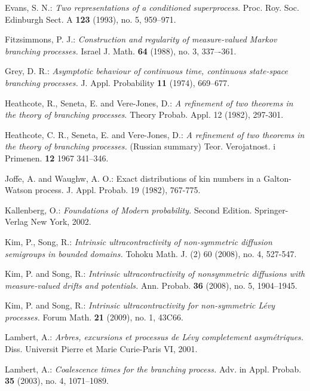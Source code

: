 \documentclass[12pt,a4paper]{amsart}
\numberwithin{equation}{section}
\theoremstyle{plain}
\theoremstyle{definition}
\theoremstyle{remark}
\begin{document}
\begin{thebibliography}{99}
Evans, S. N.:
\emph{Two representations of a conditioned superprocess.}
Proc. Roy. Soc. Edinburgh Sect. A \textbf{123} (1993), no. 5, 959--971.

Fitzsimmons, P. J.: 
\emph{Construction and regularity of measure-valued Markov branching processes.} 
Israel J. Math. \textbf{64} (1988), no. 3, 337–-361.

Grey, D. R.:
\emph{Asymptotic behaviour of continuous time, continuous state-space branching processes.}
J. Appl. Probability \textbf{11} (1974), 669--677.

Heathcote, R.,  Seneta, E.  and Vere-Jones, D.:
\emph{ A refinement of two theorems in the theory of branching processes}.
Theory Probab. Appl. 12 (1982), 297-301.

Heathcote, C. R., Seneta, E. and Vere-Jones, D.:
\emph{A refinement of two theorems in the theory of branching processes.} (Russian summary)
Teor. Verojatnost. i Primenen. \textbf{12} 1967 341--346.

Joffe, A. and Waughw, A. O.:  Exact distributions of kin numbers in a Galton-Watson
process. J. Appl. Probab. 19 (1982), 767-775.

	Kallenberg, O.:
	\emph{Foundations of Modern probability.}
	Second Edition.	Springer-Verlag New York, 2002.

Kim, P., Song, R.:
\emph{Intrinsic ultracontractivity of non-symmetric diffusion semigroups in bounded domains.}
Tohoku Math. J. (2) 60 (2008), no. 4, 527-547.

Kim, P. and Song, R.:
\emph{Intrinsic ultracontractivity of nonsymmetric diffusions with measure-valued drifts and potentials.}
Ann. Probab. \textbf{36} (2008), no. 5, 1904--1945.

Kim, P. and Song, R.:
\emph{Intrinsic ultracontractivity for non-symmetric L\'evy processes.}
Forum Math. \textbf{21} (2009), no. 1, 43C66.

Lambert, A.:
\emph{Arbres, excursions et processus de L\'evy completement asym\'etriques.}
Diss. Universit Pierre et Marie Curie-Paris VI, 2001.

Lambert, A.:
\emph{Coalescence times for the branching process.}
Adv. in Appl. Probab. \textbf{35} (2003), no. 4, 1071--1089.


\end{thebibliography}
\end{document}
